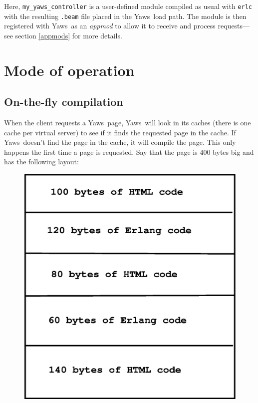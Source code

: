 \documentclass[11pt,oneside,english]{book}
\newcommand{\Yaws}            %
        {{\sc Yaws}}
\begin{document}
Here, \verb+my_yaws_controller+ is a user-defined module compiled as
usual with \verb+erlc+ with the resulting \verb+.beam+ file placed in
the \Yaws\ load path. The module is then registered with \Yaws\ as an
\emph{appmod} to allow it to receive and process requests---see
section \ref{appmods} for more details.

\chapter{Mode of operation}

\section{On-the-fly compilation}
When the client requests a \Yaws\ page, \Yaws\ will look in its caches
(there is one cache per virtual server) to see if it finds the
requested page in the cache. If \Yaws\ doesn't find the page in the
cache, it will compile the page. This only happens the first time a
page is requested.  Say that the page is 400 bytes big and has the
following layout:


\begin{figure}[h]
\begin{center}

 \includegraphics[scale=0.4] {layout}

\end{center}
\end{figure}
\end{document}
